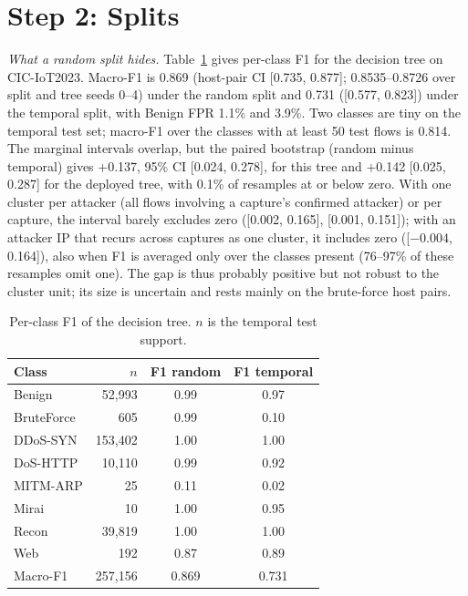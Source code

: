 \section{Step 2: Splits}\label{sec:splits}

\emph{What a random split hides.} Table~\ref{tab:perclass} gives per-class F1 for the decision tree on CIC-IoT2023. Macro-F1 is 0.869 (host-pair CI [0.735, 0.877]; 0.8535--0.8726 over split and tree seeds 0--4) under the random split and 0.731 ([0.577, 0.823]) under the temporal split, with Benign FPR 1.1\% and 3.9\%. Two classes are tiny on the temporal test set; macro-F1 over the classes with at least 50 test flows is 0.814. The marginal intervals overlap, but the paired bootstrap (random minus temporal) gives +0.137, 95\% CI [0.024, 0.278], for this tree and +0.142 [0.025, 0.287] for the deployed tree, with 0.1\% of resamples at or below zero. With one cluster per attacker (all flows involving a capture's confirmed attacker) or per capture, the interval barely excludes zero ([0.002, 0.165], [0.001, 0.151]); with an attacker IP that recurs across captures as one cluster, it includes zero ([$-0.004$, 0.164]), also when F1 is averaged only over the classes present (76--97\% of these resamples omit one). The gap is thus probably positive but not robust to the cluster unit; its size is uncertain and rests mainly on the brute-force host pairs.

\begin{table}[t]
\centering
\caption{Per-class F1 of the decision tree. $n$ is the temporal test support.}
\label{tab:perclass}
\footnotesize
\begin{tabular}{lrcc}
\hline
Class & $n$ & F1 random & F1 temporal \\
\hline
Benign     &  52,993 & 0.99 & 0.97 \\
BruteForce &     605 & 0.99 & 0.10 \\
DDoS-SYN   & 153,402 & 1.00 & 1.00 \\
DoS-HTTP   &  10,110 & 0.99 & 0.92 \\
MITM-ARP   &      25 & 0.11 & 0.02 \\
Mirai      &      10 & 1.00 & 0.95 \\
Recon      &  39,819 & 1.00 & 1.00 \\
Web        &     192 & 0.87 & 0.89 \\
\hline
Macro-F1   & 257,156 & 0.869 & 0.731 \\
\hline
\end{tabular}
\end{table}

